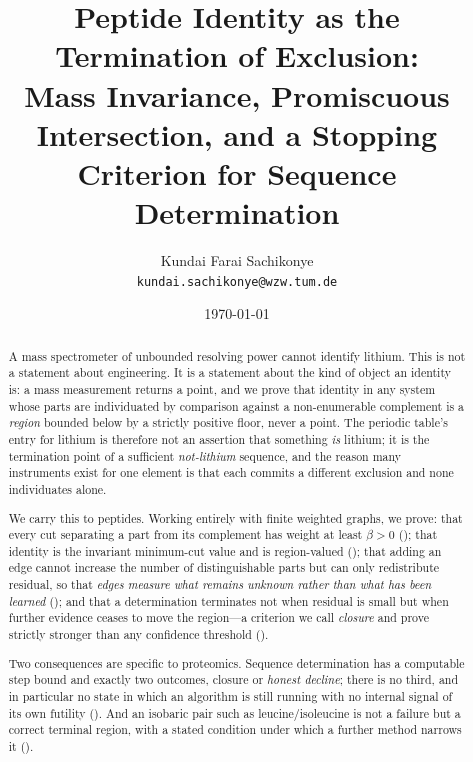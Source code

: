 \documentclass[11pt,a4paper]{article}
\title{\textbf{Peptide Identity as the Termination of Exclusion:\\[2pt]
Mass Invariance, Promiscuous Intersection, and a Stopping\\
Criterion for Sequence Determination}}
\author{Kundai Farai Sachikonye\\
\texttt{kundai.sachikonye@wzw.tum.de}}
\date{\today}
\theoremstyle{definition}
\theoremstyle{remark}
\newcommand{\flo}{\beta}                     %
\begin{document}
\maketitle

\begin{abstract}
\noindent
A mass spectrometer of unbounded resolving power cannot identify
lithium. This is not a statement about engineering. It is a statement
about the kind of object an identity is: a mass measurement returns a
point, and we prove that identity in any system whose parts are
individuated by comparison against a non-enumerable complement is a
\emph{region} bounded below by a strictly positive floor, never a point.
The periodic table's entry for lithium is therefore not an assertion that
something \emph{is} lithium; it is the termination point of a sufficient
\emph{not-lithium} sequence, and the reason many instruments exist for
one element is that each commits a different exclusion and none
individuates alone.

We carry this to peptides. Working entirely with finite weighted graphs,
we prove: that every cut separating a part from its complement has weight
at least $\flo>0$ (); that identity is the invariant
minimum-cut value and is region-valued (); that adding
an edge cannot increase the number of distinguishable parts but can only
redistribute residual, so that \emph{edges measure what remains unknown
rather than what has been learned} (); and that a
determination terminates not when residual is small but when further
evidence ceases to move the region---a criterion we call
\emph{closure} and prove strictly stronger than any confidence threshold
().

Two consequences are specific to proteomics. Sequence determination has
a computable step bound and exactly two outcomes, closure or
\emph{honest decline}; there is no third, and in particular no state in
which an algorithm is still running with no internal signal of its own
futility (). And an isobaric pair such as
leucine/isoleucine is not a failure but a correct terminal region, with
a stated condition under which a further method narrows it
().


\end{abstract}
\end{document}
